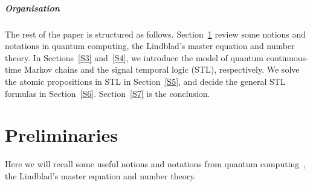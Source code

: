 \documentclass[a4paper,UKenglish,cleveref,autoref,thm-restate,authorcolumns]{lipics-v2019}
\begin{document}

\subparagraph{Organisation}
The rest of the paper is structured as follows.
Section~\ref{S2} review some notions and notations
in quantum computing, the Lindblad's master equation and number theory.
In Sections~\ref{S3} and~\ref{S4},
we introduce the model of quantum continuous-time Markov chains
and the signal temporal logic (STL), respectively.
We solve the atomic propositions in STL in Section~\ref{S5},
and decide the general STL formulas in Section~\ref{S6}.
Section~\ref{S7} is the conclusion.


\section{Preliminaries}\label{S2}
Here we will recall some useful notions and notations from quantum computing~\cite{NiC00},
the Lindblad's master equation and number theory.
\end{document}
